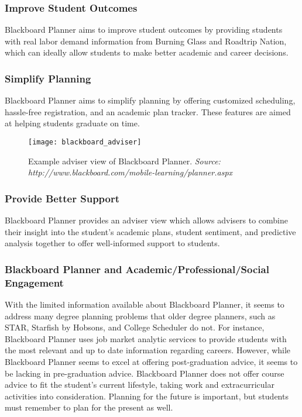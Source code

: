 \subsubsection{Improve Student Outcomes}
Blackboard Planner aims to improve student outcomes by providing students with real labor demand information from Burning Glass and Roadtrip Nation, which can ideally allow students to make better academic and career decisions.

\subsubsection{Simplify Planning}
Blackboard Planner aims to simplify planning by offering customized scheduling, hassle-free registration, and an academic plan tracker. These features are aimed at helping students graduate on time.

\begin{figure}[h]
\centering
\texttt{[image: blackboard\_adviser]}
\caption{Example adviser view of Blackboard Planner. \textit{Source: http://www.blackboard.com/mobile-learning/planner.aspx}}
\end{figure}

\subsubsection{Provide Better Support}
Blackboard Planner provides an adviser view which allows advisers to combine their insight into the student's academic plans, student sentiment, and predictive analysis together to offer well-informed support to students. 

\subsubsection{Blackboard Planner and Academic/Professional/Social Engagement}
With the limited information available about Blackboard Planner, it seems to address many degree planning problems that older degree planners, such as STAR, Starfish by Hobsons, and College Scheduler do not. For instance, Blackboard Planner uses job market analytic services to provide students with the most relevant and up to date information regarding careers. However, while Blackboard Planner seems to excel at offering post-graduation advice, it seems to be lacking in pre-graduation advice. Blackboard Planner does not offer course advice to fit the student's current lifestyle, taking work and extracurricular activities into consideration. Planning for the future is important, but students must remember to plan for the present as well. 

